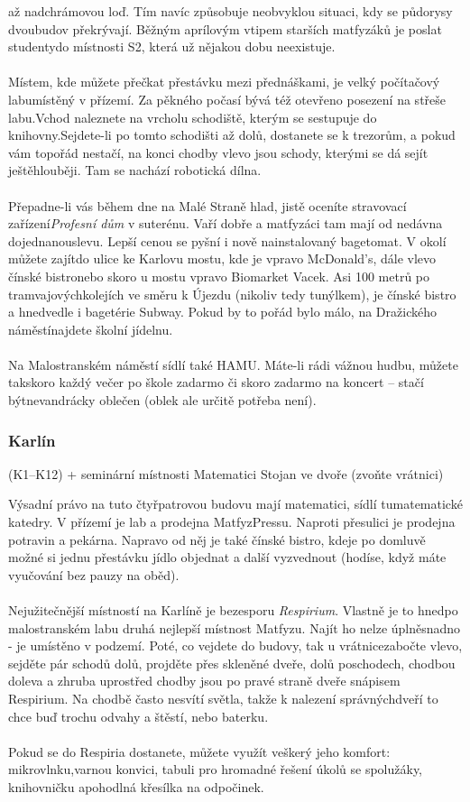 až nadchrámovou loď. Tím navíc způsobuje neobvyklou situaci, kdy se půdorysy
dvoubudov překrývají. Běžným aprílovým vtipem starších matfyzáků je poslat
studentydo místnosti S2, která už nějakou dobu neexistuje.
\\\\
Místem, kde můžete přečkat přestávku mezi přednáškami, je velký počítačový
labumístěný v přízemí. Za pěkného počasí bývá též otevřeno posezení na střeše
labu.Vchod naleznete na vrcholu schodiště, kterým se sestupuje do
knihovny.Sejdete-li po tomto schodišti až dolů, dostanete se k trezorům, a pokud
vám topořád nestačí, na konci chodby vlevo jsou schody, kterými se dá sejít
ještěhlouběji. Tam se nachází robotická dílna.
\\\\
Přepadne-li vás během dne na Malé Straně hlad, jistě oceníte stravovací
zařízení\textit{Profesní dům} v suterénu. Vaří dobře a matfyzáci tam mají od
nedávna dojednanouslevu. Lepší cenou se pyšní i nově nainstalovaný bagetomat. V
okolí můžete zajítdo ulice ke Karlovu mostu, kde je vpravo McDonald's, dále
vlevo čínské bistronebo skoro u mostu vpravo Biomarket Vacek. Asi 100 metrů po
tramvajovýchkolejích ve směru k Újezdu (nikoliv tedy tunýlkem), je čínské bistro
a hnedvedle i bagetérie Subway. Pokud by to pořád bylo málo, na Dražického
náměstínajdete školní jídelnu.
\\\\
Na Malostranském náměstí sídlí také HAMU. Máte-li rádi vážnou hudbu, můžete
takskoro každý večer po škole zadarmo či skoro zadarmo na koncert – stačí
býtnevandrácky oblečen (oblek ale určitě potřeba není).


\subsubsection{Karlín}

{ (K1--K12) + seminární místnosti}
{Matematici}
{Stojan ve dvoře (zvoňte vrátnici)}

\noindent Výsadní právo na tuto čtyřpatrovou budovu mají matematici, sídlí
tumatematické katedry. V přízemí je lab a prodejna MatfyzPressu. Naproti
přesulici je prodejna potravin a pekárna. Napravo od něj je také čínské bistro,
kdeje po domluvě možné si jednu přestávku jídlo objednat a další vyzvednout
(hodíse, když máte vyučování bez pauzy na oběd).
\\\\
Nejužitečnější místností na Karlíně je bezesporu \textit{Respirium}. Vlastně je
to hnedpo malostranském labu druhá nejlepší místnost Matfyzu. Najít ho nelze
úplněsnadno - je umístěno v podzemí. Poté, co vejdete do budovy, tak u
vrátnicezabočte vlevo, sejděte pár schodů dolů, projděte přes skleněné dveře,
dolů poschodech, chodbou doleva a zhruba uprostřed chodby jsou po pravé straně
dveře snápisem Respirium. Na chodbě často nesvítí světla, takže k nalezení
správnýchdveří to chce buď trochu odvahy a štěstí, nebo baterku.
\\\\
Pokud se do Respiria dostanete, můžete využít veškerý jeho komfort:
mikrovlnku,varnou konvici, tabuli pro hromadné řešení úkolů se spolužáky,
knihovničku apohodlná křesílka na odpočinek.


